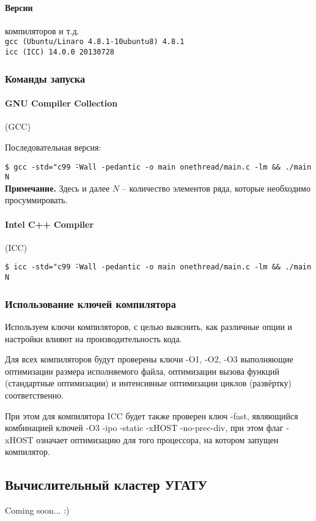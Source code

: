 \documentclass[a4paper,12pt]{article}
\begin{document}
\paragraph{Версии}компиляторов и т.д.\\
\texttt{gcc (Ubuntu/Linaro 4.8.1-10ubuntu8) 4.8.1}\\
\texttt{icc (ICC) 14.0.0 20130728}

\subsubsection{Команды запуска}
\paragraph{GNU Compiler Collection} (GCC)

Последовательная версия:

\texttt{\$ gcc -std="c99\"\ -Wall -pedantic -o\ main onethread/main.c\ -lm\ \&\& ./main N}\\

\noindent\textbf{Примечание.} Здесь и далее $N$ -- количество элементов ряда, которые необходимо просуммировать.

\paragraph{Intel C++ Compiler} (ICC)

\texttt{\$ icc -std="c99\"\ -Wall -pedantic -o\ main onethread/main.c\ -lm\ \&\& ./main N}\\

\subsubsection{Использование ключей компилятора}
Используем ключи компиляторов, с целью выяснить, как различные опции и настройки влияют на производительность кода.

Для всех компиляторов будут проверены ключи -O1, -O2, -O3 выполняющие оптимизации размера исполняемого файла, оптимизации вызова функций (стандартные оптимизации) и интенсивные оптимизации циклов (развёртку) соответственно.

При этом для компилятора ICC будет также проверен ключ -fast, являющийся комбинацией ключей -O3 -ipo -static -xHOST -no-prec-div, при этом флаг -xHOST означает оптимизацию для того процессора, на котором запущен компилятор.

\subsection{Вычислительный кластер УГАТУ}
Coming soon... :)
\end{document}
